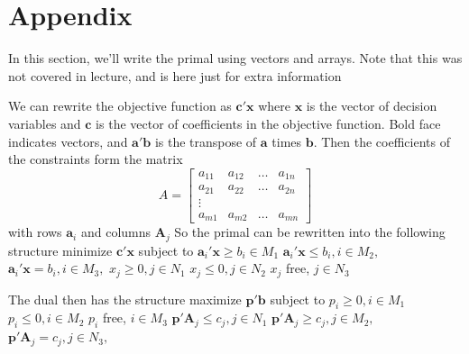 \documentclass[twoside]{article}
\begin{document}
\section{Appendix}
In this section, we'll write the primal using vectors and arrays. Note that this was not covered in lecture, and is here just for extra information

We can rewrite the objective function as 
\newline $\textbf{c}'\textbf{x}$
\newline where $\textbf{x}$ is the vector of decision variables and $\textbf{c}$ is the vector of coefficients in the objective function.
\newline Bold face indicates vectors, and $\textbf{a}'\textbf{b}$ is the transpose of $\textbf{a}$ times $\textbf{b}$.
\newline Then the coefficients of the constraints form the matrix
$$
A=
\begin{bmatrix} 
a_{11} & a_{12} & \ldots & a_{1n} \\ 
a_{21} & a_{22} & \ldots & a_{2n}\\
\vdots\\
a_{m1} & a_{m2} & \ldots & a_{mn}
\end{bmatrix}
$$
with rows $\textbf{a}_i$ and columns $\textbf{A}_j$
\newline So the primal can be rewritten into the following structure
\newline minimize 
\newline $\textbf{c}'\textbf{x}$
\newline subject to 
\newline $\textbf{a}_i'\textbf{x} \geq b_i \in M_1 $
\newline $\textbf{a}_i'\textbf{x} \leq b_i, i \in M_2,$
\newline $\textbf{a}_i'\textbf{x} = b_i, i \in M_3,$
\newline $x_j \geq 0, j \in N_1$
\newline $x_j \leq 0, j \in N_2$
\newline $x_j$ free, $j \in N_3$

\newpage
The dual then has the structure 
\newline maximize 
\newline $\textbf{p}'\textbf{b}$
\newline subject to 
\newline $p_i \geq 0, i \in M_1$
\newline $p_i \leq 0, i \in M_2$
\newline $p_i$ free, $i \in M_3$
\newline $\textbf{p}'\textbf{A}_j \leq c_j, j \in N_1 $
\newline $\textbf{p}'\textbf{A}_j \geq c_j, j \in M_2,$
\newline $\textbf{p}'\textbf{A}_j = c_j, j \in N_3,$
\end{document}
